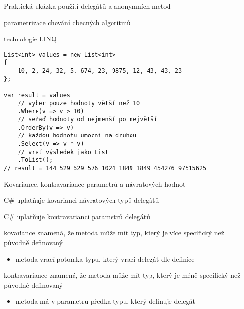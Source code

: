 \begin{frame}[fragile]
\begin{bitemize}{Praktická ukázka použití delegátů a anonymních metod}
\item parametrizace chování obecných algoritmů
\item technologie LINQ
\end{bitemize}
\vfill
\begin{yesblock}
\begin{lstlisting}
List<int> values = new List<int>
{
    10, 2, 24, 32, 5, 674, 23, 9875, 12, 43, 43, 23
};

var result = values
    // vyber pouze hodnoty větší než 10
    .Where(v => v > 10)
    // seřaď hodnoty od nejmenší po největší
    .OrderBy(v => v)
    // každou hodnotu umocni na druhou
    .Select(v => v * v)
    // vrať výsledek jako List
    .ToList();
// result = 144 529 529 576 1024 1849 1849 454276 97515625
\end{lstlisting}
\end{yesblock}
\end{frame}



\nezkouskove

\begin{frame}[fragile]
\begin{bitemize}{Kovariance, kontravariance parametrů a návratových hodnot}
\item C\# uplatňuje kovarianci návratových typů delegátů
\item C\# uplatňuje kontravarianci parametrů delegátů
\end{bitemize}

\begin{bitemize}{}
\item kovariance znamená, že metoda může mít typ, který je více specifický než původně definovaný 
\begin{itemize}
\item metoda vrací potomka typu, který vrací delegát dle definice
\end{itemize}

\item kontravariance znamená, že metoda může mít typ, který je méně specifický než původně definovaný
\begin{itemize}
\item metoda má v parametru předka typu, který definuje delegát
\end{itemize}

\end{bitemize}
\end{frame}


